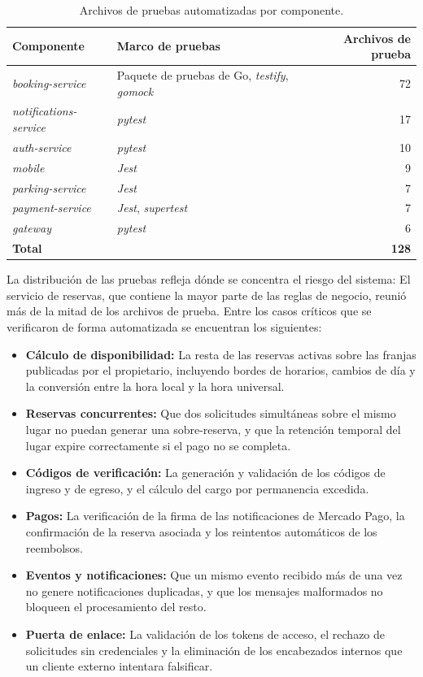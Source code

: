 \begin{table}[H]
\centering
\renewcommand{\arraystretch}{1.3}
\small
\begin{tabular}{l l r}
\toprule
\textbf{Componente} & \textbf{Marco de pruebas} & \textbf{Archivos de prueba} \\
\midrule
\textit{booking-service} & Paquete de pruebas de Go, \textit{testify}, \textit{gomock} & 72 \\
\textit{notifications-service} & \textit{pytest} & 17 \\
\textit{auth-service} & \textit{pytest} & 10 \\
\textit{mobile} & \textit{Jest} & 9 \\
\textit{parking-service} & \textit{Jest} & 7 \\
\textit{payment-service} & \textit{Jest}, \textit{supertest} & 7 \\
\textit{gateway} & \textit{pytest} & 6 \\
\midrule
\textbf{Total} & & \textbf{128} \\
\bottomrule
\end{tabular}
\caption{Archivos de pruebas automatizadas por componente.}
\label{tab:pruebas}
\end{table}

La distribución de las pruebas refleja dónde se concentra el riesgo del sistema: El servicio de reservas, que contiene la mayor parte de las reglas de negocio, reunió más de la mitad de los archivos de prueba. Entre los casos críticos que se verificaron de forma automatizada se encuentran los siguientes:

\begin{itemize}
    \item \textbf{Cálculo de disponibilidad:} La resta de las reservas activas sobre las franjas publicadas por el propietario, incluyendo bordes de horarios, cambios de día y la conversión entre la hora local y la hora universal.
    \item \textbf{Reservas concurrentes:} Que dos solicitudes simultáneas sobre el mismo lugar no puedan generar una sobre-reserva, y que la retención temporal del lugar expire correctamente si el pago no se completa.
    \item \textbf{Códigos de verificación:} La generación y validación de los códigos de ingreso y de egreso, y el cálculo del cargo por permanencia excedida.
    \item \textbf{Pagos:} La verificación de la firma de las notificaciones de Mercado Pago, la confirmación de la reserva asociada y los reintentos automáticos de los reembolsos.
    \item \textbf{Eventos y notificaciones:} Que un mismo evento recibido más de una vez no genere notificaciones duplicadas, y que los mensajes malformados no bloqueen el procesamiento del resto.
    \item \textbf{Puerta de enlace:} La validación de los tokens de acceso, el rechazo de solicitudes sin credenciales y la eliminación de los encabezados internos que un cliente externo intentara falsificar.
\end{itemize}

